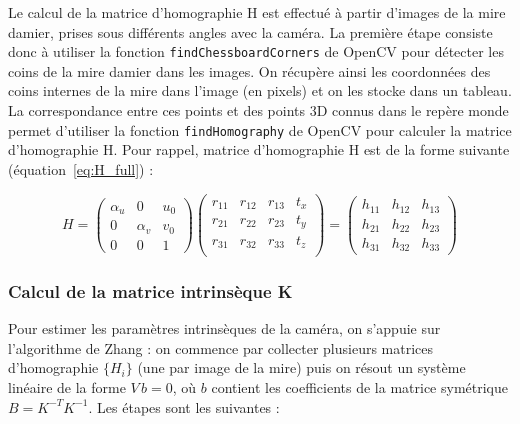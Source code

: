 \documentclass[12pt]{article}
\begin{document}
Le calcul de la matrice d'homographie H est effectué à partir d'images de la mire damier, prises sous différents angles avec la caméra.
La première étape consiste donc à utiliser la fonction \texttt{findChessboardCorners} de OpenCV pour détecter les coins de la mire damier dans les images.
On récupère ainsi les coordonnées des coins internes de la mire dans l'image (en pixels) et on les stocke dans un tableau.
La correspondance entre ces points et des points 3D connus dans le repère monde permet d'utiliser la fonction \texttt{findHomography} de OpenCV pour calculer la matrice d'homographie H.
Pour rappel, matrice d'homographie H est de la forme suivante (équation~\ref{eq:H_full}) :

\begin{equation}
    H =
\begin{pmatrix}
\alpha_{u} & 0 & u_0 \\
0 & \alpha_{v} & v_0 \\
0 & 0 & 1
\end{pmatrix}
\begin{pmatrix}
r_{11} & r_{12} & r_{13} & t_x \\
r_{21} & r_{22} & r_{23} & t_y \\
r_{31} & r_{32} & r_{33} & t_z \\
\end{pmatrix}
=
\begin{pmatrix}
h_{11} & h_{12} & h_{13} \\
h_{21} & h_{22} & h_{23} \\
h_{31} & h_{32} & h_{33}
\end{pmatrix}
\label{eq:H_full}
\end{equation}

\subsubsection{Calcul de la matrice intrinsèque K}

Pour estimer les paramètres intrinsèques de la caméra, on s’appuie sur l’algorithme de Zhang : on commence par collecter plusieurs matrices d’homographie \(\{H_i\}\) (une par image de la mire) puis on résout un système linéaire de la forme \(V\,b = 0\), où \(b\) contient les coefficients de la matrice symétrique \(B = K^{-T} K^{-1}\). Les étapes sont les suivantes :
\end{document}
